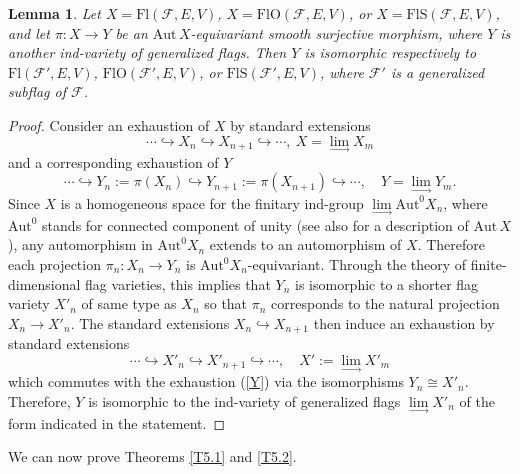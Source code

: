 \documentclass[12pt]{amsart}
\newcommand{\Flags}{\mathrm{Fl}}
\newcommand{\OFlags}{\mathrm{FlO}}
\newcommand{\SFlags}{\mathrm{FlS}}
\newtheorem{lemma}[theorem]{Lemma}
\theoremstyle{definition}
\begin{document}
 


\begin{lemma} \label{lemma-5.4new}
Let $X=\Flags(\mathcal{F},E,V)$, $X=\OFlags(\mathcal{F},E,V)$, or $X=\SFlags(\mathcal{F},E,V)$,
and let $\pi:X\to Y$ be an $\mathrm{Aut}\,X$-equivariant smooth surjective morphism, where $Y$ is another ind-variety of generalized flags. Then $Y$ is isomorphic respectively to $\Flags(\mathcal{F}',E,V)$, $\OFlags(\mathcal{F}',E,V)$, or $\SFlags(\mathcal{F}',E,V)$, where $\mathcal{F}'$ is a generalized subflag of $\mathcal{F}$.
\end{lemma}

\begin{proof}
Consider an exhaustion of $X$ by standard extensions
$$
\cdots \hookrightarrow X_n\hookrightarrow X_{n+1}\hookrightarrow \cdots,\ X=\lim_\to X_m
$$
and a corresponding exhaustion of $Y$
\begin{equation}
\label{Y}
\cdots \hookrightarrow Y_n:=\pi(X_n)\hookrightarrow Y_{n+1}:=\pi(X_{n+1})\hookrightarrow \cdots,\quad Y=\lim_\to Y_m.
\end{equation}
Since $X$ is a homogeneous space for the finitary ind-group $\lim\limits_\to\mathrm{Aut}^0X_n$, where $\mathrm{Aut}^0$ stands for connected component of unity (see also \cite{IP} for a description of $\mathrm{Aut}\,X$), any automorphism in $\mathrm{Aut}^0X_n$ extends to an automorphism of $X$. Therefore each projection $\pi_n:X_n\to Y_n$ is $\mathrm{Aut}^0X_n$-equivariant.
Through the theory of finite-dimensional flag varieties, this implies that $Y_n$ is isomorphic to a shorter flag variety $X'_n$ of same type as $X_n$ so that $\pi_n$ corresponds to the natural projection $X_n\to X'_n$.
The standard extensions $X_n\hookrightarrow X_{n+1}$ then induce an exhaustion by standard extensions
$$
\cdots \hookrightarrow X'_n\hookrightarrow X'_{n+1}\hookrightarrow \cdots,\quad X':=\lim_\to X'_m
$$
which commutes with the exhaustion (\ref{Y}) via the isomorphisms $Y_n\cong X'_n$. Therefore, $Y$ is isomorphic to the ind-variety of generalized flags $\lim\limits_\to X'_n$ of the form indicated in the statement.
\end{proof}
 

We can now prove Theorems \ref{T5.1} and \ref{T5.2}.
\end{document}
